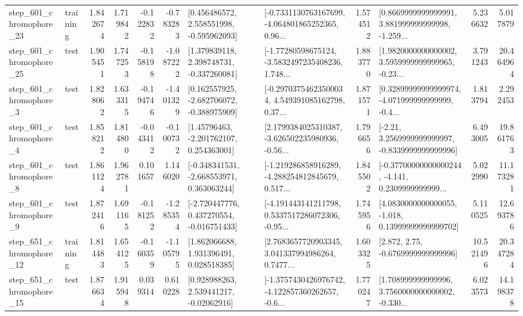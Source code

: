\begin{tabular}{llrrrrllrlrr}
  step\_601\_chromophore\_23 &  training &      1.842674 &    1.719842 &     -0.122832 & -0.783283 &    [0.456486572, 2.558551998, -0.595962093] &  [-0.7331130763167699, -4.064801865252365, 0.96... &       1.574512 &  [0.8669999999999991, 3.881999999999998, -1.259... &            5.236632 &          5.017879 \\
  step\_601\_chromophore\_25 &      test &      1.905451 &    1.747253 &     -0.158198 & -1.087222 &    [1.379839118, 2.398748731, -0.337260081] &  [-1.77280598675124, -3.5832497235408236, 1.748... &       1.883770 &  [1.9820000000000002, 3.5959999999999965, -0.23... &            3.791243 &         20.464964 \\
   step\_601\_chromophore\_3 &      test &      1.828062 &    1.633315 &     -0.194746 & -1.401329 &   [0.162557925, -2.682706072, -0.388975909] &  [-0.29703754623500034, 4.549391085162798, 0.37... &       1.871571 &  [0.32899999999999974, -4.071999999999999, -0.4... &            1.813794 &          2.292453 \\
   step\_601\_chromophore\_4 &      test &      1.858212 &    1.814800 &     -0.043412 & -0.100732 &     [1.45796463, -2.201762107, 0.254363001] &  [2.1799384025310387, -3.626502235980936, -0.56... &       1.796656 &   [-2.21, 3.2569999999999997, -0.8339999999999996] &            6.493005 &         19.861763 \\
   step\_601\_chromophore\_8 &      test &      1.861124 &    1.962781 &      0.101657 &  1.146020 &   [-0.348341531, -2.668553971, 0.363063244] &  [-1.219286858916289, -4.288254812845679, 0.517... &       1.845502 &  [-0.37700000000000244, -4.141, 0.2309999999999... &            5.022990 &         11.173281 \\
   step\_601\_chromophore\_9 &      test &      1.872416 &    1.691165 &     -0.181252 & -1.285354 &   [-2.720447776, 0.437270554, -0.016751433] &  [-4.191443141211798, 0.5337517286072306, -0.95... &       1.745956 &  [4.0830000000000055, -1.018, 0.13999999999999702] &            5.110525 &         12.693786 \\
  step\_651\_chromophore\_12 &  training &      1.814483 &    1.654125 &     -0.160359 & -1.105795 &     [1.862066688, 1.931396491, 0.028518385] &  [2.7683657720903345, 3.041337994986264, 0.7477... &       1.603325 &                 [2.872, 2.75, -0.6769999999999996] &           10.521496 &         20.347284 \\
  step\_651\_chromophore\_15 &      test &      1.876634 &    1.915948 &      0.039314 &  0.610228 &     [0.928988263, 2.539441217, -0.02062916] &  [-1.3757430426976742, -4.122857360262657, -0.6... &       1.770247 &  [1.708999999999996, 3.7560000000000002, -0.330... &            6.023573 &         14.198378 \\

\end{tabular}
